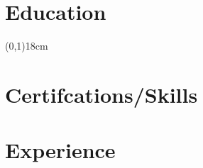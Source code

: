 \documentclass[12pt,letterpaper]{article}
\begin{document}
	
	\noindent
	\begin{minipage}[t]{0.5\linewidth}

	\section*{Education}

	

	\end{minipage}
	\begin{minipage}[t]{0.025\linewidth}
		
		\hspace{1cm}
	
	\end{minipage}
	\begin{minipage}[t][18cm][t]{0.025\linewidth}
		\hspace{1cm}
		\line(0,1){18cm}
		

	\end{minipage}
	\begin{minipage}[t]{0.4\linewidth}


	\section*{Certifcations/Skills}

	\section*{Experience}

	
	\end{minipage}
\end{document}
